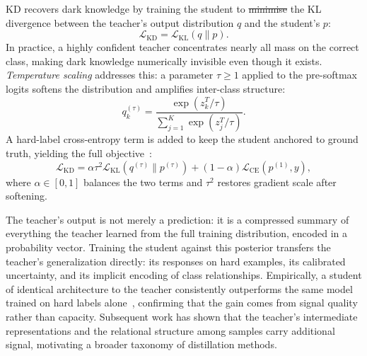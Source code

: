 \documentclass[12pt, a4paper, twoside]{book}
\makeatletter
\numberwithin{equation}{chapter}
\theoremstyle{plain}
\theoremstyle{definition}
\theoremstyle{remark}
\newenvironment{foldable}{}{}
\providecommand{\DIFaddtex}[1]{{\protect\color{blue}\uwave{#1}}} %
\providecommand{\DIFdeltex}[1]{{\protect\color{red}\sout{#1}}} %
\providecommand{\DIFaddbegin}{} %
\providecommand{\DIFaddend}{} %
\providecommand{\DIFdelbegin}{} %
\providecommand{\DIFdelend}{} %
\providecommand{\DIFadd}[1]{\texorpdfstring{\DIFaddtex{#1}}{#1}} %
\providecommand{\DIFdel}[1]{\texorpdfstring{\DIFdeltex{#1}}{}} %
\newcommand{\DIFscaledelfig}{0.5}
\newlength{\DIFdelgraphicswidth} %
\newlength{\DIFdelgraphicsheight} %
\newcommand{\DIFaddincludegraphics}[2][]{{\color{blue}\fbox{\DIFOincludegraphics[#1]{#2}}}} %
\newcommand{\DIFdelincludegraphics}[2][]{%
\sbox{\DIFdelgraphicsbox}{\DIFOincludegraphics[#1]{#2}}%
\settoboxwidth{\DIFdelgraphicswidth}{\DIFdelgraphicsbox} %
\settoboxtotalheight{\DIFdelgraphicsheight}{\DIFdelgraphicsbox} %
\scalebox{\DIFscaledelfig}{%
\parbox[b]{\DIFdelgraphicswidth}{\usebox{\DIFdelgraphicsbox}\\[-\baselineskip] \rule{\DIFdelgraphicswidth}{0em}}\llap{\resizebox{\DIFdelgraphicswidth}{\DIFdelgraphicsheight}{%
\setlength{\unitlength}{\DIFdelgraphicswidth}%
\begin{picture}(1,1)%
\thicklines\linethickness{2pt} %
{\color[rgb]{1,0,0}\put(0,0){\framebox(1,1){}}}%
{\color[rgb]{1,0,0}\put(0,0){\line( 1,1){1}}}%
{\color[rgb]{1,0,0}\put(0,1){\line(1,-1){1}}}%
\end{picture}%
}\hspace*{3pt}}} %
} %
\DeclareRobustCommand{\DIFaddbegin}{\DIFOaddbegin \let\includegraphics\DIFaddincludegraphics} %
\DeclareRobustCommand{\DIFaddend}{\DIFOaddend \let\includegraphics\DIFOincludegraphics} %
\DeclareRobustCommand{\DIFdelbegin}{\DIFOdelbegin \let\includegraphics\DIFdelincludegraphics} %
\DeclareRobustCommand{\DIFdelend}{\DIFOaddend \let\includegraphics\DIFOincludegraphics} %
\let\sout@orig\sout %
\renewcommand{\sout}[1]{\ifmmode\text{\sout@orig{\ensuremath{#1}}}\else\sout@orig{#1}\fi} %
\makeatother
\begin{document}
\begin{foldable}
  \Acl{KD} recovers dark knowledge by training the student to \DIFdelbegin \DIFdel{minimise }\DIFdelend \DIFaddbegin \DIFadd{minimize }\DIFaddend the \ac{KL} divergence between the teacher's output distribution $q$ and the student's $p$:
  \begin{equation}
    \mathcal{L}_{\text{KD}} = \mathcal{L}_\text{KL}(q \| p).
    \label{eq:kd-loss-core}
  \end{equation}
  In practice, a highly confident teacher concentrates nearly all mass on the correct class, making dark knowledge numerically invisible even though it exists.
  \textit{Temperature scaling} addresses this: a parameter $\tau \geq 1$ applied to the pre-softmax logits softens the distribution and amplifies inter-class structure:
  \begin{equation}
    q_k^{(\tau)} = \frac{\exp(z_k^{T} / \tau)}{\sum_{j=1}^{K} \exp(z_j^{T} / \tau)}.
    \label{eq:softmax-temperature}
  \end{equation}
  A hard-label cross-entropy term is added to keep the student anchored to ground truth, yielding the full objective~\cite{hinton2015distilling}:
  \begin{equation}
    \mathcal{L}_{\text{KD}}
    = \alpha \tau^{2} \mathcal{L}_\text{KL}(q^{(\tau)} \| p^{(\tau)})
    + (1 - \alpha) \mathcal{L}_{\text{CE}}(p^{(1)}, y),
    \label{eq:kd-loss}
  \end{equation}
  where $\alpha \in [0,1]$ balances the two terms and $\tau^{2}$ restores gradient scale after softening.
\end{foldable}

\begin{foldable}
  The teacher's output is not merely a prediction: it is a compressed summary of everything the teacher learned from the full training distribution, encoded in a probability vector.
  Training the student against this posterior transfers the teacher's generalization directly: its responses on hard examples, its calibrated uncertainty, and its implicit encoding of class relationships.
  Empirically, a student of identical architecture to the teacher consistently outperforms the same model trained on hard labels alone~\cite{hinton2015distilling}, confirming that the gain comes from signal quality rather than capacity.
  Subsequent work has shown that the teacher's intermediate representations and the relational structure among samples carry additional signal, motivating a broader taxonomy of distillation methods.
\end{foldable}
\end{document}
